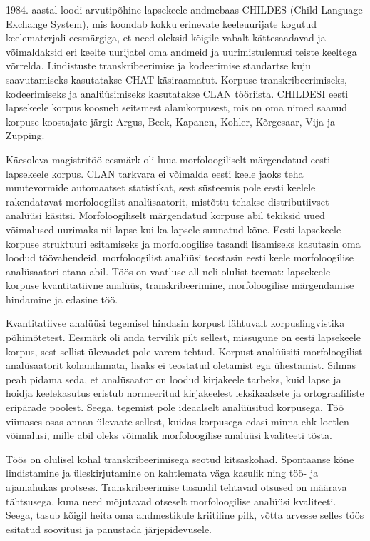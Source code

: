 \documentclass[12pt]{article}
\begin{document}
1984. aastal loodi arvutipõhine lapsekeele andmebaas CHILDES (Child Language Exchange System), mis koondab kokku erinevate keeleuurijate kogutud keelematerjali eesmärgiga, et need oleksid kõigile vabalt kättesaadavad ja võimaldaksid eri keelte uurijatel oma andmeid ja uurimistulemusi teiste keeltega võrrelda. Lindistuste transkribeerimise ja kodeerimise standartse kuju saavutamiseks kasutatakse CHAT käsiraamatut. Korpuse transkribeerimiseks, kodeerimiseks ja analüüsimiseks kasutatakse CLAN tööriista. CHILDESI eesti lapsekeele korpus koosneb seitsmest alamkorpusest, mis on oma nimed saanud korpuse koostajate järgi: Argus, Beek, Kapanen, Kohler, Kõrgesaar, Vija ja Zupping.

Käesoleva magistritöö eesmärk oli luua morfoloogiliselt märgendatud eesti lapsekeele korpus. CLAN tarkvara ei võimalda eesti keele jaoks teha muutevormide automaatset statistikat, sest süsteemis pole eesti keelele rakendatavat morfoloogilist analüsaatorit, mistõttu tehakse distributiivset analüüsi käsitsi. Morfoloogiliselt märgendatud korpuse abil tekiksid uued võimalused uurimaks nii lapse kui ka lapsele suunatud kõne. Eesti lapsekeele korpuse struktuuri esitamiseks ja morfoloogilise tasandi lisamiseks kasutasin oma loodud töövahendeid, morfoloogilist analüüsi teostasin eesti keele morfoloogilise analüsaatori etana
abil. Töös on vaatluse all neli olulist teemat: lapsekeele korpuse kvantitatiivne analüüs, transkribeerimine, morfoloogilise märgendamise hindamine ja edasine töö.

Kvantitatiivse analüüsi tegemisel hindasin korpust lähtuvalt korpuslingvistika põhimõtetest. Eesmärk oli anda tervilik pilt sellest, missugune on eesti lapsekeele korpus, sest sellist ülevaadet pole varem tehtud. Korpust analüüsiti morfoloogilist analüsaatorit kohandamata, lisaks ei teostatud oletamist ega ühestamist. Silmas peab pidama seda, et analüsaator on loodud kirjakeele tarbeks, kuid lapse ja hoidja keelekasutus eristub normeeritud kirjakeelest leksikaalsete ja ortograafiliste eripärade poolest. Seega, tegemist pole ideaalselt analüüsitud korpusega. Töö viimases osas annan ülevaate sellest, kuidas korpusega edasi minna ehk loetlen võimalusi, mille abil oleks võimalik morfoloogilise analüüsi kvaliteeti tõsta.

Töös on olulisel kohal transkribeerimisega seotud kitsaskohad. Spontaanse kõne lindistamine ja üleskirjutamine on kahtlemata väga kasulik ning töö- ja ajamahukas protsess. Transkribeerimise tasandil tehtavad otsused on määrava tähtsusega, kuna need mõjutavad otseselt morfoloogilise analüüsi kvaliteeti. Seega, tasub kõigil heita oma andmestikule kriitiline pilk, võtta arvesse selles töös esitatud soovitusi ja panustada järjepidevusele.
\end{document}
